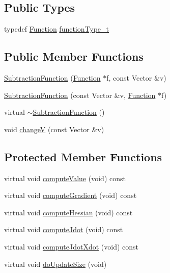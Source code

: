 \subsection*{Public Types}
\begin{DoxyCompactItemize}
\item 
typedef \hyperlink{classocra_1_1Function}{Function} \hyperlink{classocra_1_1SubtractionFunction_a371966d5def8140a019099fc4346f413}{function\+Type\+\_\+t}
\end{DoxyCompactItemize}
\subsection*{Public Member Functions}
\begin{DoxyCompactItemize}
\item 
\hyperlink{classocra_1_1SubtractionFunction_a65b777d9cbd05c1e14063fd0bb99f262}{Subtraction\+Function} (\hyperlink{classocra_1_1Function}{Function} $\ast$f, const Vector \&v)
\item 
\hyperlink{classocra_1_1SubtractionFunction_ab825dea759ffedcdd1c30b19e1df02f1}{Subtraction\+Function} (const Vector \&v, \hyperlink{classocra_1_1Function}{Function} $\ast$f)
\item 
virtual \hyperlink{classocra_1_1SubtractionFunction_a87e030eb99b05722464881e3bb220027}{$\sim$\+Subtraction\+Function} ()
\item 
void \hyperlink{classocra_1_1SubtractionFunction_a00ed4b4afd66bd91dea2f2ebbcd5b615}{changeV} (const Vector \&v)
\end{DoxyCompactItemize}
\subsection*{Protected Member Functions}
\begin{DoxyCompactItemize}
\item 
virtual void \hyperlink{classocra_1_1SubtractionFunction_a267f782772b6d032ba49d1015fa855c3}{compute\+Value} (void) const 
\item 
virtual void \hyperlink{classocra_1_1SubtractionFunction_ac3bfa55d49933d03f914c2b5dd6cd286}{compute\+Gradient} (void) const 
\item 
virtual void \hyperlink{classocra_1_1SubtractionFunction_ac8299558e4c3f95ed3bc3c25ec86649f}{compute\+Hessian} (void) const 
\item 
virtual void \hyperlink{classocra_1_1SubtractionFunction_a5d2bd9e32b5e55f238ad93ab31ac09bc}{compute\+Jdot} (void) const 
\item 
virtual void \hyperlink{classocra_1_1SubtractionFunction_a35bd8b32157143498f3fa8f3228aa454}{compute\+Jdot\+Xdot} (void) const 
\item 
virtual void \hyperlink{classocra_1_1SubtractionFunction_abeccbd4ec6cabf7bf18169e052a993d5}{do\+Update\+Size} (void)
\end{DoxyCompactItemize}
